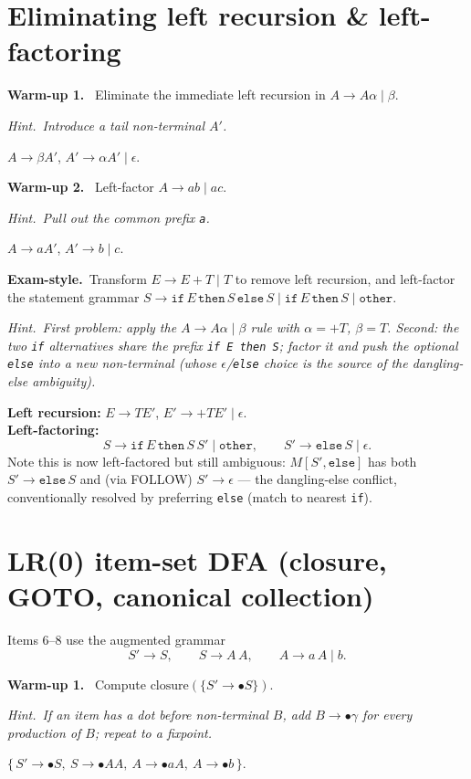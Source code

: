 \documentclass[11pt,a4paper]{article}
\newcommand{\hint}[1]{\par{\small\textcolor{accent}{\textit{Hint.}}\ \textit{#1}}\par\smallskip}
\newcommand{\warm}[1]{\smallskip\textbf{\textcolor{hi}{Warm-up #1.}}\ }
\newcommand{\exam}{\smallskip\textbf{\textcolor{warn}{Exam-style.}}\ }
\begin{document}
\section{Eliminating left recursion \& left-factoring}

\warm{1} Eliminate the immediate left recursion in $A\to A\alpha\mid\beta$.
\hint{Introduce a tail non-terminal $A'$.}
\begin{sol}
$A\to\beta A'$, \quad $A'\to\alpha A'\mid\epsilon$.
\end{sol}

\warm{2} Left-factor $A\to a b\mid a c$.
\hint{Pull out the common prefix \texttt{a}.}
\begin{sol}
$A\to a A'$, \quad $A'\to b\mid c$.
\end{sol}

\exam Transform $E\to E+T\mid T$ to remove left recursion, and left-factor the statement grammar
$S\to \texttt{if}\,E\,\texttt{then}\,S\,\texttt{else}\,S\mid \texttt{if}\,E\,\texttt{then}\,S\mid \texttt{other}$.
\hint{First problem: apply the $A\to A\alpha\mid\beta$ rule with $\alpha={+}T$, $\beta=T$. Second: the two \texttt{if} alternatives share the prefix \texttt{if E then S}; factor it and push the optional \texttt{else} into a new non-terminal (whose $\epsilon$/\texttt{else} choice is the source of the dangling-else ambiguity).}
\begin{sol}
\textbf{Left recursion:} $E\to TE'$, $E'\to+TE'\mid\epsilon$.\\[2pt]
\textbf{Left-factoring:}
\[
S\to \texttt{if}\,E\,\texttt{then}\,S\,S'\mid\texttt{other},\qquad
S'\to \texttt{else}\,S\mid\epsilon.
\]
Note this is now left-factored but still ambiguous: $M[S',\texttt{else}]$ has both $S'\to\texttt{else}\,S$ and (via FOLLOW) $S'\to\epsilon$ --- the dangling-else conflict, conventionally resolved by preferring \texttt{else} (match to nearest \texttt{if}).
\end{sol}

\section{LR(0) item-set DFA (closure, GOTO, canonical collection)}

Items 6--8 use the augmented grammar
\[
S'\to S,\qquad S\to A\,A,\qquad A\to a\,A\mid b.
\]

\warm{1} Compute $\mathrm{closure}(\{S'\to{\bullet}S\})$.
\hint{If an item has a dot before non-terminal $B$, add $B\to\bullet\gamma$ for every production of $B$; repeat to a fixpoint.}
\begin{sol}
$\{\,S'\to{\bullet}S,\ S\to{\bullet}AA,\ A\to{\bullet}aA,\ A\to{\bullet}b\,\}$.
\end{sol}
\end{document}
